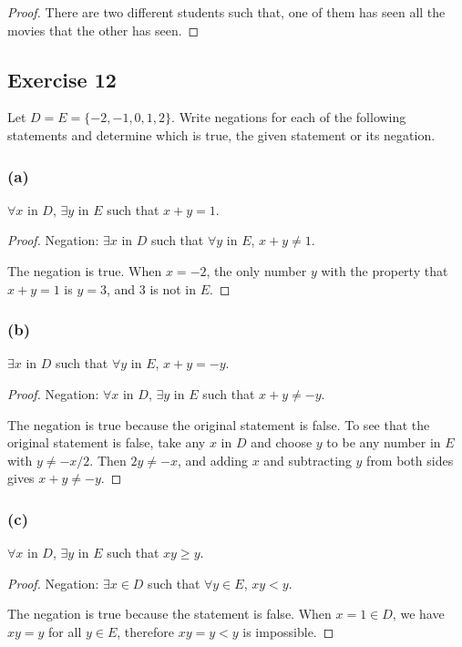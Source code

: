 \documentclass[14pt]{extarticle}
\newcommand{\fa}{\forall}
\newcommand{\te}{\exists}
\begin{document}
\begin{proof}
    There are two different students such that, one of them has seen all the movies that the other has seen.
\end{proof}

\subsection{Exercise 12}
Let $D = E = \{-2, -1, 0, 1, 2\}$. Write negations for each of the following statements and determine which is true, the given statement or its negation.

\subsubsection{(a)}
$\fa x$ in $D$, $\te y$ in $E$ such that $x + y = 1$.

\begin{proof}
    Negation: $\te x$ in $D$ such that $\fa y$ in $E$, $x + y \neq 1$.

    The negation is true. When $x = -2$, the only number $y$ with the property that $x + y = 1$ is $y = 3$, and 3 is not in $E$.
\end{proof}

\subsubsection{(b)}
$\te x$ in $D$ such that $\fa y$ in $E$, $x + y = -y$.

\begin{proof}
    Negation: $\fa x$ in $D$, $\te y$ in $E$ such that $x + y \neq -y$.

    The negation is true because the original statement is false. To see that the original statement is false, take any $x$ in $D$ and choose $y$ to be any number in $E$ with $y \neq -x/2$. Then $2y \neq -x$, and adding $x$ and subtracting $y$ from both sides gives $x + y \neq -y$.
\end{proof}

\subsubsection{(c)}
$\fa x$ in $D$, $\te y$ in $E$ such that $xy \geq y$.

\begin{proof}
    Negation: $\te x \in D$ such that $\fa y \in E$, $xy < y$.

    The negation is true because the statement is false. When $x = 1 \in D$, we have $xy = y$ for all $y \in E$, therefore $xy = y < y$ is impossible.
\end{proof}
\end{document}
